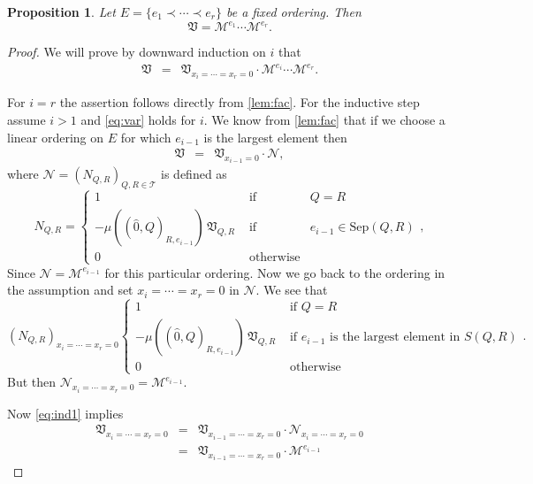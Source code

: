 \documentclass[12pt]{amsart}
\def\Var{{\mathfrak V}}
\def\Tscr{{\mathcal T}}
\theoremstyle{plain}
\numberwithin{Lemma}{\DefaultNumberTheoremWithin}
\numberwithin{Claim}{\DefaultNumberTheoremWithin}
\numberwithin{Theorem}{\DefaultNumberTheoremWithin}
\numberwithin{Corollary}{\DefaultNumberTheoremWithin}
\newtheorem{Proposition}{Proposition}
\numberwithin{Proposition}{\DefaultNumberTheoremWithin}
\numberwithin{Conjecture}{\DefaultNumberTheoremWithin}
\numberwithin{Situation}{\DefaultNumberTheoremWithin}
\numberwithin{Note}{\DefaultNumberTheoremWithin}
\theoremstyle{definition}
\numberwithin{Definition}{\DefaultNumberTheoremWithin}
\theoremstyle{definition}
\numberwithin{Question}{\DefaultNumberTheoremWithin}
\theoremstyle{definition}
\numberwithin{Problem}{\DefaultNumberTheoremWithin}
\theoremstyle{remark} \newtheorem{Remark}{Remark}
\numberwithin{Remark}{\DefaultNumberTheoremWithin}
\theoremstyle{remark}
\numberwithin{Example}{\DefaultNumberTheoremWithin}
\numberwithin{Case}{Lemma}
\numberwithin{Step}{Lemma}
\begin{document}
\begin{Proposition}
  \label{pro:fac}
  Let $E = \{ e_1 \prec \cdots \prec e_r\}$ be a fixed
  ordering. Then 
  $$\Var = \mathcal{M}^{e_1} \cdots \mathcal{M}^{e_r}.$$ 
\end{Proposition}
\begin{proof}
  We will prove by downward induction on $i$ that
  \begin{eqnarray}
     \label{eq:var}
     \Var & = & \Var_{x_i=\cdots = x_r = 0} \cdot \mathcal{M}^{e_i} \cdots \mathcal{M}^{e_r}.
  \end{eqnarray}

  For $i=r$ the assertion follows directly from 
  \ref{lem:fac}.
  For the inductive step assume
  $i > 1$ and \eqref{eq:var} holds for $i$. 
  We know from \ref{lem:fac} that if we choose a linear ordering
  on $E$ for which $e_{i-1}$ is the largest element then 
  \begin{eqnarray}
	    \label{eq:ind1} 
	    \Var & = & \Var_{x_{i-1}=0}\cdot \mathcal{N},
	  \end{eqnarray}
	  where
	  $\mathcal{N} = (N_{Q,R})_{Q,R \in \Tscr}$ is defined as
	  $$N_{Q,R} = \left\{ 
	    \begin{array}{ccc} 
		1 & \mbox{~if~} & Q = R \\ 
	       -\mu((\hat{0},Q)_{R,e_{i-1}})\, \Var_{Q,R} & \mbox{~if~} & e_{i-1} \in \text{Sep}(Q,R)\\

		0 & \mbox{~otherwise} & 
	    \end{array} \right. , 
	  $$
	  Since $\mathcal{N} = \mathcal{M}^{e_{i-1}}$ for this particular ordering. Now we go back to the ordering in the assumption and set $x_i=\cdots   = x_r = 0$ in $\mathcal{N}$. We see that
	  $$(N_{Q,R})_{x_i=\cdots   = x_r = 0} \left\{ 
	    { \begin{array}{cl} 
		1 & \mbox{~if~}  Q = R \\ 
	       -\mu((\hat{0},Q)_{R,e_{i-1}})\, \Var_{Q,R} & \mbox{~if~} e_{i-1} \mbox{~is the largest element in~} S(Q,R) \\
		0 & \mbox{~otherwise}  
	    \end{array}} \right. . 
	  $$
	  But then
	  $\mathcal{N}_{x_i=\cdots   = x_r = 0} = \mathcal{M}^{e_{i-1}}$. 
	 
	  Now \eqref{eq:ind1} implies
	  \begin{eqnarray*}
	      \Var_{x_i=\cdots = x_{r}=0} &= & \Var_{x_{i-1}= \cdots = x_{r} = 0} \cdot
	       \mathcal{N}_{x_i = \cdots = x_r = 0} \\
					  & = & \Var_{x_{i-1}= \cdots = x_{r} = 0} \cdot
	\mathcal{M}^{e_{i-1}} 
	  \end{eqnarray*}


\end{proof}
\end{document}
